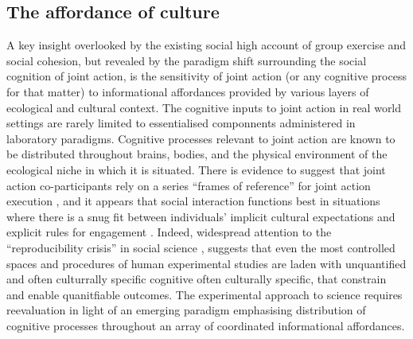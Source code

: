 \subsection{The affordance of culture}
A key insight overlooked by the existing social high account of group exercise and social cohesion, but revealed by the paradigm shift surrounding the social cognition of joint action, is the sensitivity of joint action (or any cognitive process for that matter) to informational affordances provided by various layers of ecological and cultural context.  The cognitive inputs to joint action in real world settings are rarely limited to essentialised componnents administered in laboratory paradigms. Cognitive processes relevant to joint action are known to be distributed throughout brains, bodies, and the physical environment of the ecological niche in which it is situated.  There is evidence to suggest that joint action co-participants rely on a series ``frames of reference'' for joint action execution \citep{Ray2018}, and it appears that social interaction functions best in situations where there is a snug fit between individuals' implicit cultural expectations and explicit rules for engagement \citep{Vollan2017}.  Indeed, widespread attention to the ``reproducibility crisis'' in social science \citep{Earp2015,Rathmacher2017}, suggests that even the most controlled spaces and procedures of human experimental studies are laden with unquantified and often culturrally specific cognitive often culturally specific, that constrain and enable quanitfiable outcomes.  The experimental approach to science requires reevaluation in light of an emerging paradigm emphasising distribution of cognitive processes throughout an array of coordinated informational affordances.

